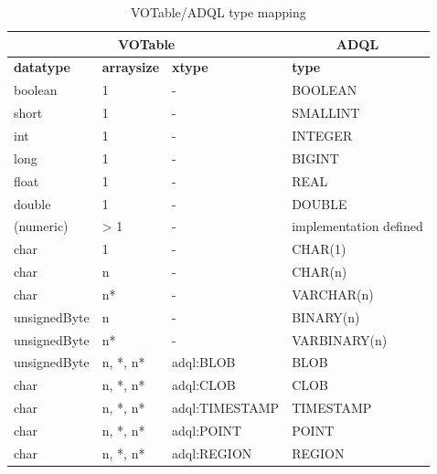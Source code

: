 \documentclass[11pt,a4paper]{ivoa}
\begin{document}
\begin{table}[thm]\footnotesize
    \begin{tabular}{|p{}|p{}|p{}|p{}|}
        \hline

        \hline
        \multicolumn{3}{|c|}{\textbf{VOTable}} &
        \multicolumn{1}{|c|}{\textbf{ADQL}}
        \tabularnewline
        
        \hline
        \textbf{datatype} &
        \textbf{arraysize} &
        \textbf{xtype} &
        \textbf{type}
        \tabularnewline

        \hline
        boolean &
        1 &
        - &
        BOOLEAN
        \tabularnewline

        \hline
        short &
        1 &
        - &
        SMALLINT
        \tabularnewline

        \hline
        int &
        1 &
        - &
        INTEGER
        \tabularnewline

        \hline
        long &
        1 &
        - &
        BIGINT
        \tabularnewline

        \hline
        float &
        1 &
        - &
        REAL
        \tabularnewline

        \hline
        double &
        1 &
        - &
        DOUBLE
        \tabularnewline

        \hline
        (numeric) &
        > 1 &
        - &
        implementation defined
        \tabularnewline

        \hline
        char &
        1 &
        - &
        CHAR(1)
        \tabularnewline

        \hline
        char &
        n &
        - &
        CHAR(n)
        \tabularnewline

        \hline
        char &
        n* &
        - &
        VARCHAR(n)
        \tabularnewline

        \hline
        unsignedByte &
        n &
        - &
        BINARY(n)
        \tabularnewline

        \hline
        unsignedByte &
        n* &
        - &
        VARBINARY(n)
        \tabularnewline

        \hline
        unsignedByte &
        n, *, n* &
        adql:BLOB &
        BLOB
        \tabularnewline

        \hline
        char &
        n, *, n* &
        adql:CLOB &
        CLOB
        \tabularnewline

        \hline
        char &
        n, *, n* &
        adql:TIMESTAMP &
        TIMESTAMP
        \tabularnewline

        \hline
        char &
        n, *, n* &
        adql:POINT &
        POINT
        \tabularnewline

        \hline
        char &
        n, *, n* &
        adql:REGION &
        REGION
        \tabularnewline

        \hline
    \end{tabular}
    \caption{VOTable/ADQL type mapping}
    \label{table:adql.votable.type.map}
\end{table}
\end{document}
